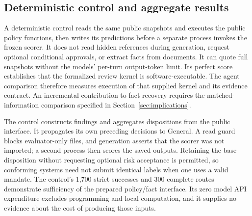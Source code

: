\subsection{Deterministic control and aggregate results}

A deterministic control reads the same public snapshots and executes the public policy functions,
then writes its predictions before a separate process invokes the frozen scorer. It does not
read hidden references during generation, request optional conditional approvals, or extract
facts from documents. It can quote full snapshots without the models' per-turn output-token
limit. Its perfect score establishes that the formalized review kernel is software-executable.
The agent comparison therefore measures execution of that supplied kernel and its evidence
contract. An incremental contribution to fact recovery requires the matched-information
comparison specified in Section~\ref{sec:implications}.

The control constructs findings and aggregates dispositions from the public interface. It
propagates its own preceding decisions to General. A read guard blocks evaluator-only files,
and generation asserts that the scorer was not imported; a second process then scores the
saved outputs. Retaining the base disposition without requesting optional risk acceptance is
permitted, so conforming systems need not submit identical labels when one uses a valid mandate.
The control's 1,700 strict successes and 300 complete routes demonstrate sufficiency of the
prepared policy/fact interface. Its zero model API expenditure excludes programming and local
computation, and it supplies no evidence about the cost of producing those inputs.

